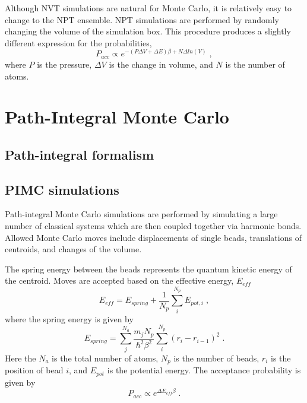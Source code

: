 \documentclass[12pt]{report}
\begin{document}
Although NVT simulations are natural for Monte Carlo, it is relatively easy to
change to the NPT ensemble. NPT simulations are performed by randomly changing
the volume of the simulation box. This procedure produces a slightly
different expression for the probabilities,
\begin{equation}
 P_{acc} \propto e^{-(P\Delta V+\Delta E)\beta+N\Delta ln(V)} \; ,
\end{equation}
where $P$ is the pressure, $\Delta V$ is the change in volume, and $N$ is
the number of atoms.

\FloatBarrier

\section{Path-Integral Monte Carlo}

\subsection{Path-integral formalism}



\subsection{PIMC simulations}

Path-integral Monte Carlo simulations are performed by simulating a large
number of classical systems which are then coupled together via harmonic
bonds. Allowed Monte Carlo moves include displacements of single beads,
translations of centroids, and changes of the volume.

The spring energy between the beads represents the quantum kinetic energy of
the centroid. Moves are accepted based on the effective energy, $E_{eff}$
\begin{equation}
 E_{eff} = E_{spring}+\frac{1}{N_p}\sum_i^{N_p} E_{pot,i} \; ,
\end{equation}
where the spring energy is given by
\begin{equation}
 E_{spring} = \sum_{j}^{N_a} \frac{m_{j}N_{p}}{\hbar^2\beta^2}
              \sum_{i}^{N_p} (r_{i}-r_{i-1})^2  \; .
\end{equation}
Here the $N_a$ is the total number of atoms, $N_p$ is the number of beads,
$r_i$ is the position of bead $i$, and $E_{pot}$ is the potential energy. The
acceptance probability is given by
\begin{equation}
 P_{acc} \propto e^{\Delta E_{eff}\beta} \; .
\end{equation}
\end{document}
